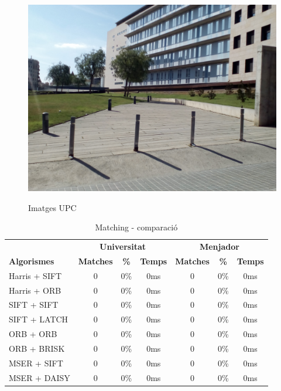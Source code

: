 \begin{figure}[!htb]
				\label{fig:awesome_image3}
			\endminipage\hfill
				\includegraphics[width=\linewidth]{images/experiments/uni4}
				\label{fig:awesome_image3}
			\endminipage
			\caption{Imatges UPC}
		\end{figure}

		\begin{table}[H]
			\begin{center}
				\begin{tabular}{l | c c c | c c c}
					& \multicolumn{3}{c|}{\textbf{Universitat}} & \multicolumn{3}{c}{\textbf{Menjador}} \\
					\textbf{Algorismes} & \textbf{Matches} & \textbf{\%} & \textbf{Temps} & \textbf{Matches} & \textbf{\%} & \textbf{Temps} \\ \hline
					Harris + SIFT & 0 & 0\% & 0ms & 0 & 0\% & 0ms \\
					Harris + ORB & 0 & 0\% & 0ms & 0 & 0\% & 0ms \\
					SIFT + SIFT & 0 & 0\% & 0ms & 0 & 0\% & 0ms \\
					SIFT + LATCH & 0 & 0\% & 0ms & 0 & 0\% & 0ms \\
					ORB + ORB & 0 & 0\% & 0ms & 0 & 0\% & 0ms \\
					ORB + BRISK & 0 & 0\% & 0ms & 0 & 0\% & 0ms \\
					MSER + SIFT & 0 & 0\% & 0ms & 0 & 0\% & 0ms \\
					MSER + DAISY & 0 & 0\% & 0ms & 0 & 0\% & 0ms \\
				\end{tabular}
			\end{center}
			\caption{Matching - comparació}
		\end{table}

